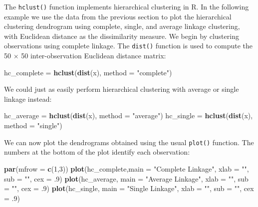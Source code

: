 \documentclass[openany]{book}
\newenvironment{Shaded}{\begin{snugshade}}{\end{snugshade}}
\newcommand{\DataTypeTok}[1]{\textcolor[rgb]{0.13,0.29,0.53}{#1}}
\newcommand{\DecValTok}[1]{\textcolor[rgb]{0.00,0.00,0.81}{#1}}
\newcommand{\FloatTok}[1]{\textcolor[rgb]{0.00,0.00,0.81}{#1}}
\newcommand{\KeywordTok}[1]{\textcolor[rgb]{0.13,0.29,0.53}{\textbf{#1}}}
\newcommand{\NormalTok}[1]{#1}
\newcommand{\StringTok}[1]{\textcolor[rgb]{0.31,0.60,0.02}{#1}}
\begin{document}
The \texttt{hclust()} function implements hierarchical clustering in R. In the following example we use the data from the previous section to plot the hierarchical
clustering dendrogram using complete, single, and average linkage clustering,
with Euclidean distance as the dissimilarity measure. We begin by
clustering observations using complete linkage. The \texttt{dist()} function is used
to compute the 50 \(\times\) 50 inter-observation Euclidean distance matrix:

\begin{Shaded}
\begin{Highlighting}[]
\NormalTok{hc_complete =}\StringTok{ }\KeywordTok{hclust}\NormalTok{(}\KeywordTok{dist}\NormalTok{(x), }\DataTypeTok{method =} \StringTok{"complete"}\NormalTok{)}
\end{Highlighting}
\end{Shaded}

We could just as easily perform hierarchical clustering with average or
single linkage instead:

\begin{Shaded}
\begin{Highlighting}[]
\NormalTok{hc_average =}\StringTok{ }\KeywordTok{hclust}\NormalTok{(}\KeywordTok{dist}\NormalTok{(x), }\DataTypeTok{method =} \StringTok{"average"}\NormalTok{)}
\NormalTok{hc_single =}\StringTok{ }\KeywordTok{hclust}\NormalTok{(}\KeywordTok{dist}\NormalTok{(x), }\DataTypeTok{method =} \StringTok{"single"}\NormalTok{)}
\end{Highlighting}
\end{Shaded}

We can now plot the dendrograms obtained using the usual \texttt{plot()} function.
The numbers at the bottom of the plot identify each observation:

\begin{Shaded}
\begin{Highlighting}[]
\KeywordTok{par}\NormalTok{(}\DataTypeTok{mfrow =} \KeywordTok{c}\NormalTok{(}\DecValTok{1}\NormalTok{,}\DecValTok{3}\NormalTok{))}
\KeywordTok{plot}\NormalTok{(hc_complete,}\DataTypeTok{main =} \StringTok{"Complete Linkage"}\NormalTok{, }\DataTypeTok{xlab =} \StringTok{""}\NormalTok{, }\DataTypeTok{sub =} \StringTok{""}\NormalTok{, }\DataTypeTok{cex =} \FloatTok{.9}\NormalTok{)}
\KeywordTok{plot}\NormalTok{(hc_average, }\DataTypeTok{main =} \StringTok{"Average Linkage"}\NormalTok{, }\DataTypeTok{xlab =} \StringTok{""}\NormalTok{, }\DataTypeTok{sub =} \StringTok{""}\NormalTok{, }\DataTypeTok{cex =} \FloatTok{.9}\NormalTok{)}
\KeywordTok{plot}\NormalTok{(hc_single, }\DataTypeTok{main =} \StringTok{"Single Linkage"}\NormalTok{, }\DataTypeTok{xlab =} \StringTok{""}\NormalTok{, }\DataTypeTok{sub =} \StringTok{""}\NormalTok{, }\DataTypeTok{cex =} \FloatTok{.9}\NormalTok{)}
\end{Highlighting}
\end{Shaded}
\end{document}
